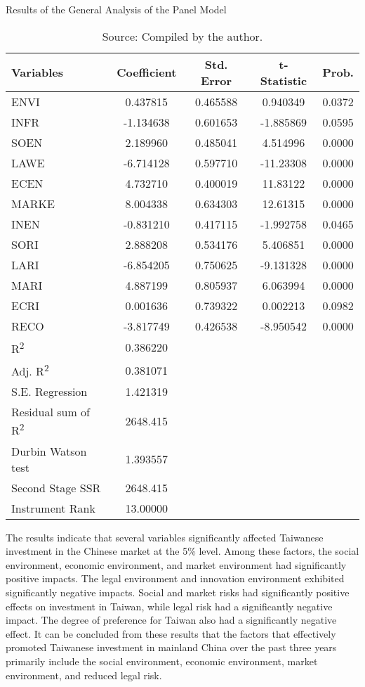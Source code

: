 \documentclass{article}
\begin{document}
\begin{table}[H]
\centering
\caption{Results of the General Analysis of the Panel Model}
\begin{tabular}{l S[table-format=-1.6] S[table-format=1.6] S[table-format=-1.6] S[table-format=1.4]}
\toprule
\textbf{Variables} & \textbf{Coefficient} & \textbf{Std. Error} & \textbf{t-Statistic} & \textbf{Prob.} \\
\midrule
ENVI   &  0.437815 & 0.465588 &  0.940349 & 0.0372 \\
INFR   & -1.134638 & 0.601653 & -1.885869 & 0.0595 \\
SOEN   &  2.189960 & 0.485041 &  4.514996 & 0.0000 \\
LAWE   & -6.714128 & 0.597710 & -11.23308 & 0.0000 \\
ECEN   &  4.732710 & 0.400019 &  11.83122 & 0.0000 \\
MARKE  &  8.004338 & 0.634303 &  12.61315 & 0.0000 \\
INEN   & -0.831210 & 0.417115 & -1.992758 & 0.0465 \\
SORI   &  2.888208 & 0.534176 &  5.406851 & 0.0000 \\
LARI   & -6.854205 & 0.750625 & -9.131328 & 0.0000 \\
MARI   &  4.887199 & 0.805937 &  6.063994 & 0.0000 \\
ECRI   &  0.001636 & 0.739322 &  0.002213 & 0.0982 \\
RECO   & -3.817749 & 0.426538 & -8.950542 & 0.0000 \\
\midrule
R\textsuperscript{2}           & 0.386220 & & & \\
Adj. R\textsuperscript{2}     & 0.381071 & & & \\
S.E. Regression & 1.421319 & & & \\
Residual sum of R\textsuperscript{2} & 2648.415 & & & \\
Durbin Watson test & 1.393557 & & & \\
Second Stage SSR & 2648.415 & & & \\
Instrument Rank & 13.00000 & & & \\
\bottomrule
\end{tabular}
\caption*{Source: Compiled by the author.}
\label{tab:panel}
\end{table}

The results indicate that several variables significantly affected Taiwanese investment in the Chinese market at the 5\% level. Among these factors, the social environment, economic environment, and market environment had significantly positive impacts. The legal environment and innovation environment exhibited significantly negative impacts. Social and market risks had significantly positive effects on investment in Taiwan, while legal risk had a significantly negative impact. The degree of preference for Taiwan also had a significantly negative effect. It can be concluded from these results that the factors that effectively promoted Taiwanese investment in mainland China over the past three years primarily include the social environment, economic environment, market environment, and reduced legal risk.
\end{document}
